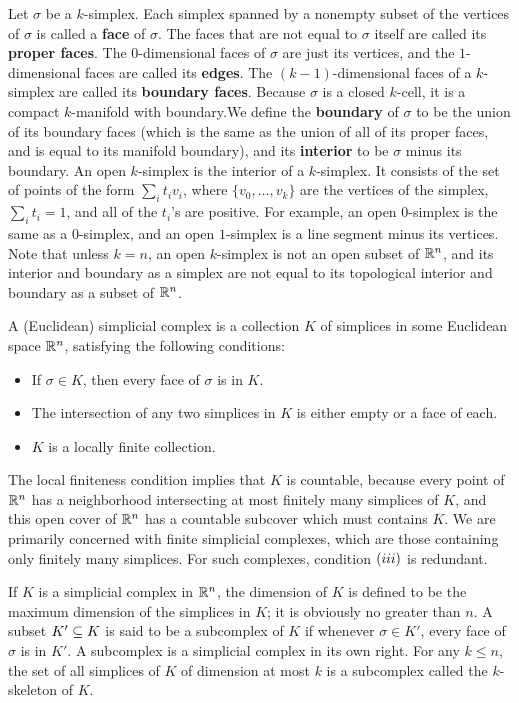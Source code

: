 Let $\sigma$ be a $k$-simplex. Each simplex spanned by a nonempty subset of the vertices of $\sigma$ is called a \textbf{face} of $\sigma$. The faces that are not equal to $\sigma$ itself are called its \textbf{proper faces}. The $0$-dimensional faces of $\sigma$ are just its vertices, and the $1$-dimensional faces are called its \textbf{edges}. The $(k-1)$-dimensional faces of a $k$-simplex are called
its \textbf{boundary faces}. Because $\sigma$ is a closed $k$-cell, it is a compact $k$-manifold with boundary.We define the \textbf{boundary} of $\sigma$ to be the union of its boundary faces (which is the same as the union of all of its proper faces, and is equal to its manifold boundary), and its \textbf{interior} to be $\sigma$ minus its boundary. An open $k$-simplex is the interior of a $k$-simplex. It consists of the set of points of the form $\sum_it_iv_i$, where $\{v_0,\dots,v_k\}$ are the vertices of the simplex, $\sum_it_i=1$, and all of the $t_i$'s are positive. For example, an open $0$-simplex is the same as a $0$-simplex, and an open $1$-simplex is a line segment minus its vertices. Note that unless $k=n$, an open $k$-simplex is not an open subset of $\mathbb{R}^n$, and its interior and boundary as a simplex are not equal to its topological interior and boundary as a subset of $\mathbb{R}^n$.\par
A (Euclidean) simplicial complex is a collection $K$ of simplices in some Euclidean
space $\mathbb{R}^n$, satisfying the following conditions:
\begin{itemize}
\item If $\sigma\in K$, then every face of $\sigma$ is in $K$.
\item The intersection of any two simplices in $K$ is either empty or a face of each.
\item $K$ is a locally finite collection.
\end{itemize}
The local finiteness condition implies that $K$ is countable, because every point of $\mathbb{R}^n$ has a neighborhood intersecting at most finitely many simplices of $K$, and this open cover of $\mathbb{R}^n$ has a countable subcover which must contains $K$. We are primarily concerned with finite simplicial complexes, which are those containing only finitely many simplices. For such complexes, condition $(\rmnum{3})$ is redundant.\par
If $K$ is a simplicial complex in $\mathbb{R}^n$, the dimension of $K$ is defined to be the
maximum dimension of the simplices in $K$; it is obviously no greater than $n$. A subset $K'\subseteq K$ is said to be a subcomplex of $K$ if whenever $\sigma\in K'$, every face of $\sigma$ is in $K'$. A subcomplex is a simplicial complex in its own right. For any $k\leq n$, the set of all simplices of $K$ of dimension at most $k$ is a subcomplex called the $k$-skeleton of $K$.\par
